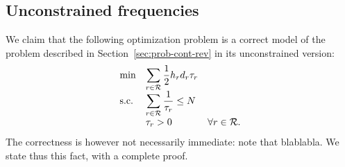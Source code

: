 





\subsection{Unconstrained frequencies}



We claim that the following optimization problem is a correct model of the problem described in Section~\ref{sec:prob-cont-rev} in its unconstrained version:
\begin{equation}\label{eq:cont-rev-det}
  \begin{array}{lll}
  \min & \displaystyle\sum_{r\in\mathcal{R}} \frac{1}{2}h_rd_r\tau_r \\
  \text{s.c.}  & \displaystyle\sum_{r\in\mathcal{R}} \frac{1}{\tau_r} \le N \\
       & \tau_r > 0 & \forall r\in\mathcal{R}.
  \end{array}
\end{equation}
The correctness is however not necessarily immediate: note that blablabla. We state thus this fact, with a complete proof.

